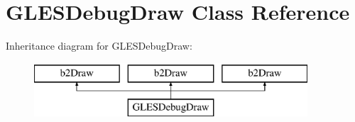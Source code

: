 \hypertarget{class_g_l_e_s_debug_draw}{\section{G\-L\-E\-S\-Debug\-Draw Class Reference}
\label{class_g_l_e_s_debug_draw}
}
Inheritance diagram for G\-L\-E\-S\-Debug\-Draw\-:\begin{figure}[H]
\begin{center}
\leavevmode
\includegraphics[height=2.000000cm]{class_g_l_e_s_debug_draw}
\end{center}
\end{figure}
